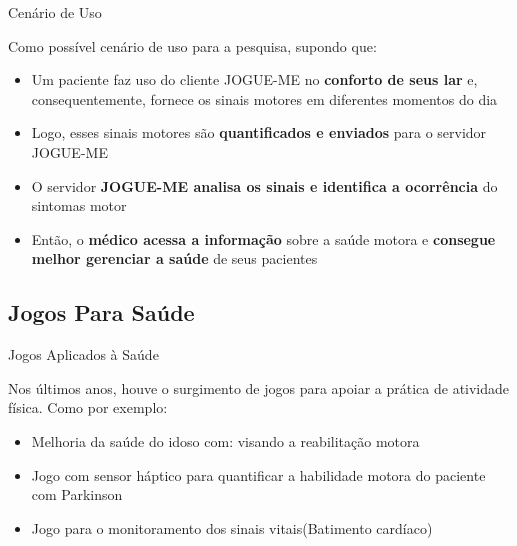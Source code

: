 \documentclass{beamer}
\begin{document}
\begin{frame}{Cenário de Uso}
   \begin{block}{}
      Como possível cenário de uso para a pesquisa, supondo que:
      \begin{itemize}
       \item Um paciente faz uso do cliente JOGUE-ME no \textbf{conforto de seus lar} e, consequentemente, fornece os sinais motores em diferentes momentos do dia
       \item Logo, esses sinais motores são \textbf{quantificados e enviados} para o servidor JOGUE-ME
       \item O servidor \textbf{JOGUE-ME analisa os sinais e identifica a ocorrência} do sintomas motor
       \item Então, o \textbf{médico acessa a informação} sobre a saúde motora e \textbf{consegue melhor gerenciar a saúde} de seus pacientes 
      \end{itemize}
  \end{block}
\end{frame}


\subsection{Jogos Para Saúde}
\begin{frame}{Jogos Aplicados à Saúde}
	\begin{block}{}	
	Nos últimos anos, houve o surgimento de jogos para apoiar a prática de atividade física. Como por exemplo:
	
	\begin{itemize}
	    \item Melhoria da saúde do idoso com: visando a reabilitação motora~\cite{sacbespoke2014}
	    \item Jogo com sensor háptico para quantificar a habilidade motora do paciente com Parkinson~\cite{atkinson2010}
	    \item Jogo para o monitoramento dos sinais vitais(Batimento cardíaco)~\cite{Sinclair:2009:UVB:1515604.1515617}
	\end{itemize}
	\end{block}
\end{frame}
\end{document}

